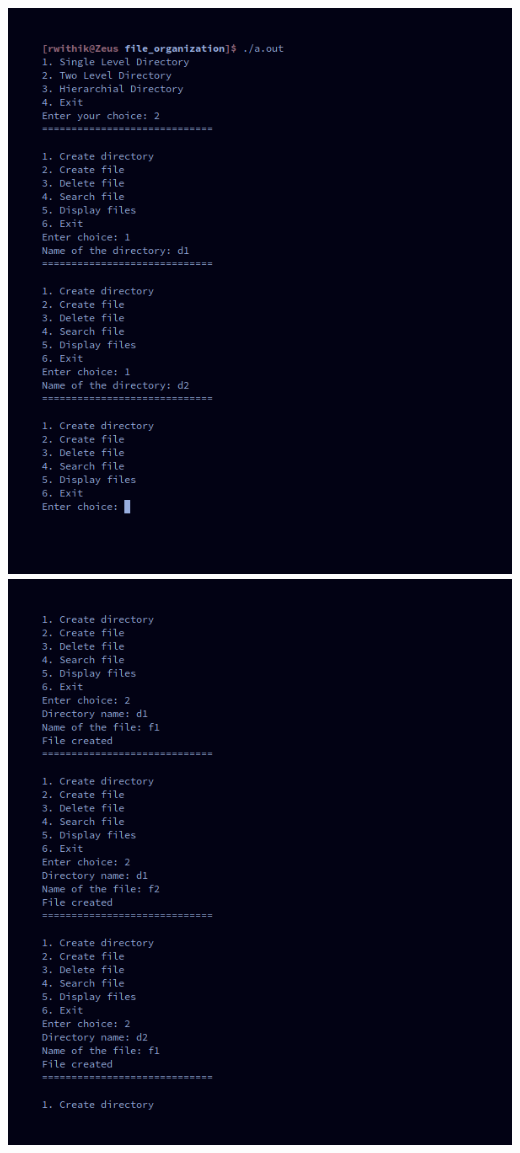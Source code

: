 \documentclass[10pt,a4paper,titlepage]{report}
\begin{document}
{\includegraphics[width=\linewidth]{../Images/file_organization/3.png}\newline
\includegraphics[width=\linewidth]{../Images/file_organization/4.png}\newline
}
\end{document}
